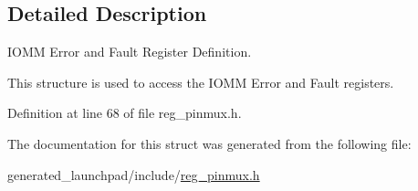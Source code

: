 \subsection{Detailed Description}
I\+O\+MM Error and Fault Register Definition. 

This structure is used to access the I\+O\+MM Error and Fault registers. 

Definition at line 68 of file reg\+\_\+pinmux.\+h.



The documentation for this struct was generated from the following file\+:\begin{DoxyCompactItemize}
\item 
generated\+\_\+launchpad/include/\mbox{\hyperlink{reg__pinmux_8h}{reg\+\_\+pinmux.\+h}}\end{DoxyCompactItemize}
